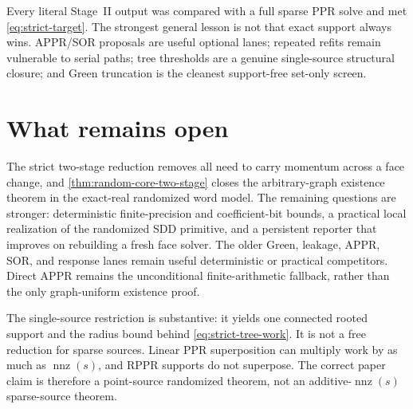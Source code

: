 Every literal Stage~II output was compared with a full sparse PPR solve and
met \cref{eq:strict-target}.  The strongest general lesson is not that exact
support always wins.  APPR/SOR proposals are useful optional lanes; repeated
refits remain vulnerable to serial paths; tree thresholds are a genuine
single-source structural closure; and Green truncation is the cleanest
support-free set-only screen.

\section{What remains open}

The strict two-stage reduction removes all need to carry momentum across a
face change, and \cref{thm:random-core-two-stage} closes the arbitrary-graph
existence theorem in the exact-real randomized word model.  The remaining
questions are stronger: deterministic finite-precision and coefficient-bit
bounds, a practical local realization of the randomized SDD primitive, and a
persistent reporter that improves on rebuilding a fresh face solver.  The
older Green, leakage, APPR, SOR, and response lanes remain useful deterministic
or practical competitors.  Direct APPR remains the unconditional
finite-arithmetic fallback, rather than the only graph-uniform existence
proof.

The single-source restriction is substantive: it yields one connected rooted
support and the radius bound behind \cref{eq:strict-tree-work}.  It is not a
free reduction for sparse sources.  Linear PPR superposition can multiply
work by as much as $\operatorname{nnz}(s)$, and RPPR supports do not
superpose.  The correct paper claim is therefore a point-source randomized
theorem, not an additive-$\operatorname{nnz}(s)$ sparse-source theorem.
